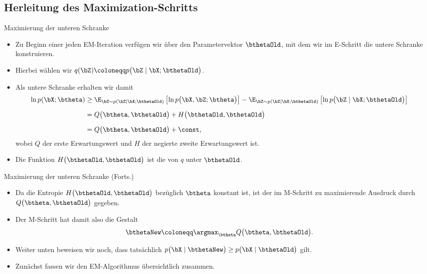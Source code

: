 \subsection{Herleitung des Maximization-Schritts}

\begin{frame}{Maximierung der unteren Schranke}{}
	\begin{itemize}
		\item Zu Beginn einer jeden EM-Iteration verfügen wir über den Parametervektor $\bthetaOld$, mit dem wir im E-Schritt
			die untere Schranke konstruieren.
		\item Hierbei wählen wir $q(\bZ) \coloneqq p\bigl( \bZ \mid \bX; \bthetaOld \bigr)$.
		\item Als untere Schranke erhalten wir damit
		\begin{align*}
			\ln p(\bX; \btheta)
				&\ge \E_{\bZ \sim p(\bZ \mid \bX; \bthetaOld)}\left[ \ln p\bigl( \bX, \bZ; \btheta \bigr) \right]
					- \E_{\bZ \sim p(\bZ \mid \bX; \bthetaOld)}\left[ \ln p\bigl( \bZ \mid \bX; \bthetaOld \bigr) \right]
		\\[2mm]
				&= Q\bigl( \btheta, \bthetaOld \bigr) + H\bigl( \bthetaOld, \bthetaOld \bigr)
		\\[2mm]
				&= Q\bigl( \btheta, \bthetaOld \bigr) + \const,
		\end{align*}
			wobei $Q$ der erste Erwartungswert und $H$ der negierte zweite Erwartungswert ist.
		\item Die Funktion $H\bigl( \bthetaOld, \bthetaOld \bigr)$ ist die  von $q$ unter $\bthetaOld$.
	\end{itemize}
\end{frame}


\begin{frame}{Maximierung der unteren Schranke (Forts.)}{}
	\begin{itemize}
		\item Da die Entropie $H\bigl( \bthetaOld, \bthetaOld \bigr)$ bezüglich $\btheta$ konstant ist, ist der im M-Schritt zu maximierende
			Ausdruck durch $Q\bigl( \btheta, \bthetaOld \bigr)$ gegeben.
		\item Der M-Schritt hat damit also die Gestalt
		\begin{equation} \label{eq:m-step}
			\bthetaNew \coloneqq \argmax_{\btheta} Q\bigl( \btheta, \bthetaOld \bigr).
		\end{equation}
		\item Weiter unten beweisen wir noch, dass tatsächlich $p\bigl(\bX \mid \bthetaNew \bigr) \ge p\bigl(\bX \mid \bthetaOld \bigr)$ gilt.
		\item Zunächst fassen wir den EM-Algorithmus übersichtlich zusammen.
	\end{itemize}
\end{frame}


